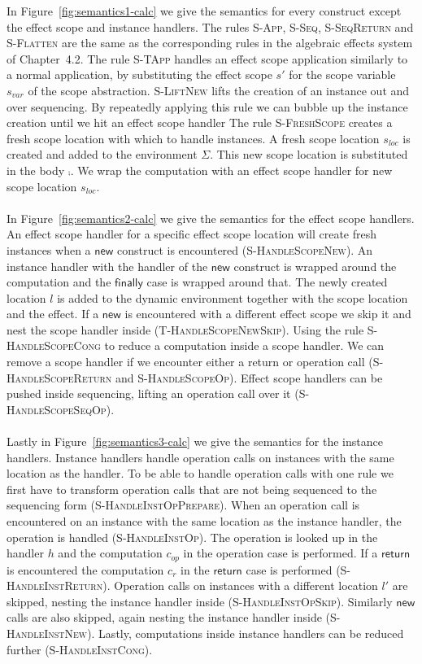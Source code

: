 {In Figure~\ref{fig:semantics1-calc} we give the semantics for every construct except the effect scope and instance handlers.
The rules \textsc{S-App}, \textsc{S-Seq}, \textsc{S-SeqReturn} and \textsc{S-Flatten} are the same as the corresponding rules in the
algebraic effects system of Chapter~4.2.
The rule \textsc{S-TApp} handles an effect scope application similarly to a normal application, by substituting the effect scope $s'$ for the scope variable $s_{var}$ of the scope abstraction.
\textsc{S-LiftNew} lifts the creation of an instance out and over sequencing.
By repeatedly applying this rule we can bubble up the instance creation until we hit an effect scope handler
The rule \textsc{S-FreshScope} creates a fresh scope location with which to handle instances.
A fresh scope location $s_{loc}$ is created and added to the environment $\Sigma$.
This new scope location is substituted in the body $\comp$.
We wrap the computation with an effect scope handler for new scope location $s_{loc}$.
\\\\
In Figure~\ref{fig:semantics2-calc} we give the semantics for the effect scope handlers.
An effect scope handler for a specific effect scope location will create fresh instances when a $\mathsf{new}$ construct is encountered (\textsc{S-HandleScopeNew}).
An instance handler with the handler of the $\mathsf{new}$ construct is wrapped around the computation and the $\mathsf{finally}$ case is wrapped around that.
The newly created location $l$ is added to the dynamic environment together with the scope location and the effect.
If a $\mathsf{new}$ is encountered with a different effect scope we skip it and nest the scope handler inside (\textsc{T-HandleScopeNewSkip}).
Using the rule \textsc{S-HandleScopeCong} to reduce a computation inside a scope handler.
We can remove a scope handler if we encounter either a return or operation call (\textsc{S-HandleScopeReturn} and \textsc{S-HandleScopeOp}).
Effect scope handlers can be pushed inside sequencing, lifting an operation call over it (\textsc{S-HandleScopeSeqOp}).
\\\\
Lastly in Figure~\ref{fig:semantics3-calc} we give the semantics for the instance handlers.
Instance handlers handle operation calls on instances with the same location as the handler.
To be able to handle operation calls with one rule we first have to transform operation calls that are not being sequenced to the sequencing form (\textsc{S-HandleInstOpPrepare}).
When an operation call is encountered on an instance with the same location as the instance handler, the operation is handled (\textsc{S-HandleInstOp}).
The operation is looked up in the handler $h$ and the computation $c_{op}$ in the operation case is performed.
If a $\mathsf{return}$ is encountered the computation $c_r$ in the $\mathsf{return}$ case is performed (\textsc{S-HandleInstReturn}).
Operation calls on instances with a different location $l'$ are skipped, nesting the instance handler inside (\textsc{S-HandleInstOpSkip}).
Similarly $\mathsf{new}$ calls are also skipped, again nesting the instance handler inside (\textsc{S-HandleInstNew}).
Lastly, computations inside instance handlers can be reduced further (\textsc{S-HandleInstCong}).

}
